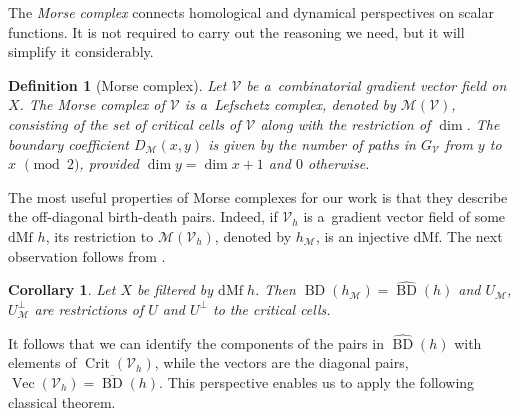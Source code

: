 \documentclass[a4paper,12pt, USenglish,cleveref,autoref,thm-restate]{article}
\newtheorem{corollary}[theorem]{Corollary}
\newtheorem{definition}[theorem]{Definition}
\newcommand{\mf}{h}
\DeclareMathOperator{\bd}{BD}
\newcommand{\diagbd}{\overline{\bd}}
\newcommand{\upbd}{\hat{\bd}}
\newcommand{\dmf}{\text{dMf}}
\newcommand{\mU}{U}
\newcommand{\hmU}{\mU}
\newcommand{\cmU}{\mU^{\perp}}
\newcommand{\mB}{D}
\newcommand{\cx}{x}
\newcommand{\cy}{y}
\newcommand{\cV}{\mathcal{V}}
\newcommand{\cM}{\mathcal{M}}
\newcommand{\morsehmB}{\mB_{\cM}}
\newcommand{\morsehmU}{\mU_{\cM}}
\newcommand{\morsecmU}{\mU_{\cM}^{\perp}}
\DeclareMathOperator{\crit}{Crit}
\DeclareMathOperator{\vect}{Vec}
\begin{document}

\noindent The \emph{Morse complex} connects homological and dynamical perspectives on scalar functions. It is not required to carry out the reasoning we need, but it will simplify it considerably.  

\begin{definition}[Morse complex]
    \label{def:morse_complex}
    Let $\cV$ be a~combinatorial gradient vector field on $X$. The \emph{Morse complex of $\cV$} is a~Lefschetz complex, denoted by $\cM(\cV)$, consisting of the set of critical cells of $\cV$ along with the restriction of $\dim$. The boundary coefficient $D_{\cM}(\cx, \cy)$ is given by the number of paths in $G_\cV$ from $\cy$ to $\cx$ $\pmod{2}$, provided $\dim \cy = \dim \cx + 1$ and $0$ otherwise.
    
\end{definition}

\noindent The most useful properties of Morse complexes for our work is that they describe the off-diagonal birth-death pairs. Indeed, if $\cV_{\mf}$ is a~gradient vector field of some $\dmf$ $\mf$, its restriction to $\cM(\cV_{\mf})$, denoted by $\mf_{\cM}$, is an injective $\dmf$. 
The next observation follows from \cite[Theorem~4.3]{EdelMroz2023}. 

\begin{corollary}
\label{thm:morse_complex}
    Let $X$ be filtered by $\dmf \; \mf$. Then $\bd(\mf_{\cM}) = \upbd(\mf)$ and $\morsehmU$, $\morsecmU$ are restrictions of $\hmU$ and $\cmU$ to the critical cells.
\end{corollary}


\noindent It follows that we can identify the components of the pairs in $\upbd(h)$ with elements of $\crit(\cV_{\mf})$, while the vectors are the diagonal pairs, $\vect(\cV_{\mf}) = \diagbd(\mf)$. This perspective enables us to apply the following classical theorem. 
\end{document}
